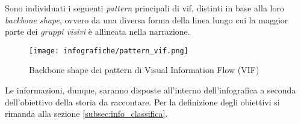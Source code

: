 Sono individuati i seguenti \emph{pattern} principali di \gls{vif}, distinti in base alla loro \emph{backbone shape}, ovvero da una diversa forma della linea lungo cui la 
maggior parte dei \emph{gruppi visivi} è allineata nella narrazione.

\begin{figure}[H] 
    \centering 
    \texttt{[image: infografiche/pattern\_vif.png]} 
    \caption{Backbone shape dei pattern di Visual Information Flow (VIF)}
    \label{fig:pattern_vif}
\end{figure}

\bigskip
\noindent Le informazioni, dunque, saranno disposte all'interno dell'infografica a seconda dell'obiettivo della storia da raccontare.
Per la definizione degli obiettivi si rimanda alla sezione \ref{subsec:info_classifica}.

